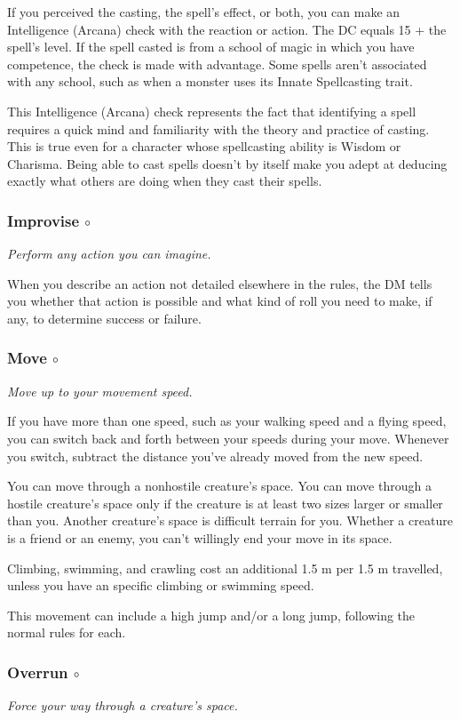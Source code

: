     If you perceived the casting, the spell's effect, or both, you can make an Intelligence (Arcana) check with the reaction or action.
    The DC equals 15 + the spell's level.
    If the spell casted is from a school of magic in which you have competence, the check is made with advantage.
    Some spells aren't associated with any school, such as when a monster uses its Innate Spellcasting trait.

    This Intelligence (Arcana) check represents the fact that identifying a spell requires a quick mind and familiarity with the theory and practice of casting.
    This is true even for a character whose spellcasting ability is Wisdom or Charisma.
    Being able to cast spells doesn't by itself make you adept at deducing exactly what others are doing when they cast their spells.
\subsubsection{Improvise $\circ$}
    \textit{Perform any action you can imagine.}

    When you describe an action not detailed elsewhere in the rules, the DM tells you whether that action is possible and what kind of roll you need to make, if any, to determine success or failure.
\subsubsection{Move $\circ$}
    \textit{Move up to your movement speed.}

    If you have more than one speed, such as your walking speed and a flying speed, you can switch back and forth between your speeds during your move.
    Whenever you switch, subtract the distance you've already moved from the new speed.

    You can move through a nonhostile creature's space.
    You can move through a hostile creature's space only if the creature is at least two sizes larger or smaller than you.
    Another creature's space is difficult terrain for you.
    Whether a creature is a friend or an enemy, you can't willingly end your move in its space.

    Climbing, swimming, and crawling cost an additional 1.5 m per 1.5 m travelled, unless you have an specific climbing or swimming speed.

    This movement can include a high jump and/or a long jump, following the normal rules for each.
\subsubsection{Overrun $\circ$}
    \textit{Force your way through a creature's space.}

